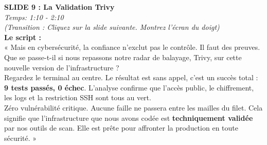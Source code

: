 \documentclass[a4paper,12pt]{article}
\begin{document}
\begin{minipage}[t][0.45\textheight]{\textwidth}
\textbf{\huge SLIDE 9 : La Validation Trivy}\\
\normalsize \textit{Temps: 1:10 - 2:10}\\

\large
\textit{(Transition : Cliquez sur la slide suivante. Montrez l'écran du doigt)}\\

\textbf{Le script :}\\
« Mais en cybersécurité, la confiance n'exclut pas le contrôle. Il faut des preuves. Que se passe-t-il si nous repassons notre radar de balayage, Trivy, sur cette nouvelle version de l'infrastructure ?\\

Regardez le terminal au centre. Le résultat est sans appel, c'est un succès total : \textbf{9 tests passés, 0 échec}. L'analyse confirme que l'accès public, le chiffrement, les logs et la restriction SSH sont tous au vert.\\

Zéro vulnérabilité critique. Aucune faille ne passera entre les mailles du filet. Cela signifie que l'infrastructure que nous avons codée est \textbf{techniquement validée} par nos outils de scan. Elle est prête pour affronter la production en toute sécurité. »
\end{minipage}

\newpage
\end{document}
